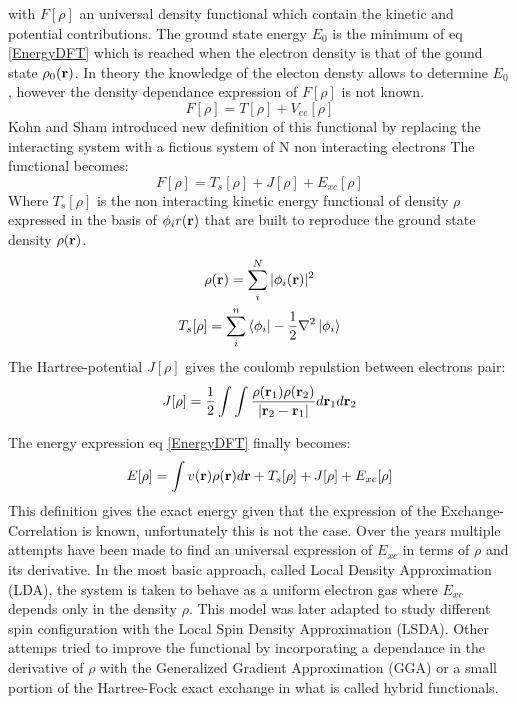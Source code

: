 \documentclass[10pt]{report}
\numberwithin{equation}{section}
\begin{document}
with $F[\rho]$ an universal density functional which contain the kinetic and potential contributions.
The ground state energy $E_0$ is the minimum of eq \ref{EnergyDFT} which is reached when the electron density is that of the gound state $\rho_0(\vb r)$.
In theory the knowledge of the electon densty allows to determine $E_0$, however the density dependance expression of $F[\rho]$ is not known.
\begin{equation}
    F[\rho]=T[\rho]+V_{ee}[\rho]
\end{equation}
Kohn and Sham introduced new definition of this functional by replacing the interacting system with a fictious system of N non interacting electrons%
The functional becomes:
\begin{equation}
    F[\rho]=T_s[\rho]+J[\rho]+E_{xc}[\rho]
\end{equation}
Where $T_s[\rho]$ is the non interacting kinetic energy functional of density $\rho$ expressed in the basis of $\phi_i r(\vb r)$ that are built to reproduce the ground state density $\rho(\vb r)$.
\begin{gather}
    \rho(\vb r) = \sum_{i}^{N} |\phi_i (\vb r)|^2\\
    T_s[\rho]=\sum_{i}^{n} \bra{\phi_i} -\frac{1}{2}\nabla^2 \ket{\phi_i}
\end{gather}
The Hartree-potential $J[\rho]$ gives the coulomb repulstion between electrons pair:
\begin{equation}
    J[\rho]=\frac{1}{2}\int\int \frac{\rho(\vb r_1) \rho(\vb r_2)}{|\vb r_2 - \vb r_1 |} d\vb r_1 d\vb r_2
\end{equation}

The energy expression eq \ref{EnergyDFT} finally becomes:
\begin{equation}
    E[\rho]= \int v(\vb r) \rho(\vb r) d\vb r + T_s[\rho] + J[\rho]+ E_{xc}[\rho]
\end{equation}
This definition gives the exact energy given that the expression of the Exchange-Correlation is known, unfortunately this is not the case. 
Over the years multiple attempts have been made to find an universal expression of $E_{xc}$ in terms of $\rho$ and its derivative. 
In the most basic approach, called Local Density Approximation (LDA), the system is taken to behave as a uniform electron gas where $E_{xc}$ depends only in the density $\rho$. 
This model was later adapted to study different spin configuration with the Local Spin Density Approximation (LSDA).
Other attemps tried to improve the functional by incorporating a dependance in the derivative of $\rho$ with the Generalized Gradient Approximation (GGA) or a small portion of the Hartree-Fock exact exchange in what is called hybrid functionals.
\end{document}
